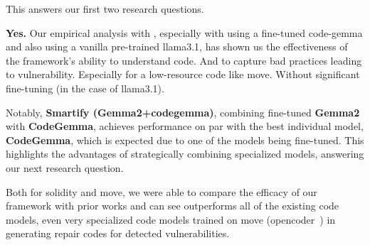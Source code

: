This answers our first two research questions.

\begin{tcolorbox}[
  colback=green!15, %
  colframe=green!40, %
  title=RQ1 \& RQ2 - Code Understanding and Vuln. Detection,
  coltitle=black, %
  fonttitle=\bfseries,
  boxrule=0.75mm, %
  rounded corners, %
  left=1mm, %
  right=1mm, %
  top=1mm, %
  bottom=1mm %
]
\textbf{Yes.} Our empirical analysis with \sln{}, especially with using a fine-tuned code-gemma and also using a vanilla pre-trained llama3.1, has shown us the effectiveness of the framework's ability to understand code. And to capture bad practices leading to vulnerability. Especially for a low-resource code like move. Without significant fine-tuning (in the case of llama3.1).
\end{tcolorbox}

Notably, \textbf{Smartify (Gemma2+codegemma)}, combining fine-tuned \textbf{Gemma2} with \textbf{CodeGemma}, achieves performance on par with the best individual model, \textbf{CodeGemma}, which is expected due to one of the models being fine-tuned. This highlights the advantages of strategically combining specialized models, answering our next research question.

\begin{tcolorbox}[
  colback=green!15, %
  colframe=green!40, %
  title=RQ3 - Code Repair,
  fonttitle=\bfseries,
    coltitle=black, %
  boxrule=0.75mm, %
  rounded corners, %
  left=1mm, %
  right=1mm, %
  top=1mm, %
  bottom=1mm %
]
Both for solidity and move, we were able to compare the efficacy of our framework with prior works and can see \sln{} outperforms all of the existing code models, even very specialized code models trained on move (opencoder~\cite{huang2024opencoder}) in generating repair codes for detected vulnerabilities. 
\end{tcolorbox}

